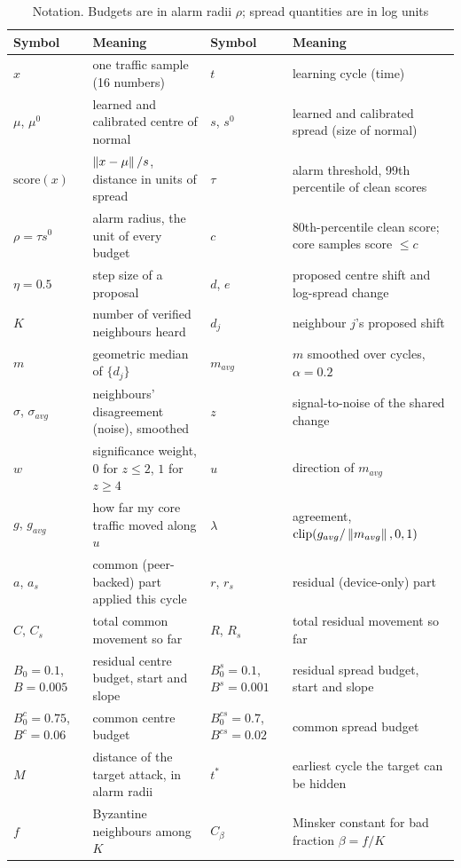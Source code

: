\begin{table}[t]
\caption{Notation. Budgets are in alarm radii $\rho$; spread quantities are in log units}\label{tab:notation}
\centering\footnotesize
\begin{tabular}{@{}ll@{\hspace{1.5em}}ll@{}}
\toprule
Symbol & Meaning & Symbol & Meaning \\
\midrule
$x$ & one traffic sample (16 numbers) & $t$ & learning cycle (time) \\
$\mu$, $\mu^0$ & learned and calibrated centre of normal & $s$, $s^0$ & learned and calibrated spread (size of normal) \\
$\mathrm{score}(x)$ & $\left\lVert x-\mu \right\rVert/s$, distance in units of spread & $\tau$ & alarm threshold, 99th percentile of clean scores \\
$\rho=\tau s^0$ & alarm radius, the unit of every budget & $c$ & 80th-percentile clean score; core samples score $\le c$ \\
$\eta=0.5$ & step size of a proposal & $d$, $e$ & proposed centre shift and log-spread change \\
$K$ & number of verified neighbours heard & $d_j$ & neighbour $j$'s proposed shift \\
$m$ & geometric median of $\{d_j\}$ & $m_{avg}$ & $m$ smoothed over cycles, $\alpha=0.2$ \\
$\sigma$, $\sigma_{avg}$ & neighbours' disagreement (noise), smoothed & $z$ & signal-to-noise of the shared change \\
$w$ & significance weight, $0$ for $z\le2$, $1$ for $z\ge4$ & $u$ & direction of $m_{avg}$ \\
$g$, $g_{avg}$ & how far my core traffic moved along $u$ & $\lambda$ & agreement, $\mathrm{clip}(g_{avg}/\left\lVert m_{avg} \right\rVert,0,1)$ \\
$a$, $a_s$ & common (peer-backed) part applied this cycle & $r$, $r_s$ & residual (device-only) part \\
$C$, $C_s$ & total common movement so far & $R$, $R_s$ & total residual movement so far \\
$B_0=0.1$, $B=0.005$ & residual centre budget, start and slope & $B_0^s=0.1$, $B^s=0.001$ & residual spread budget, start and slope \\
$B_0^c=0.75$, $B^c=0.06$ & common centre budget & $B_0^{cs}=0.7$, $B^{cs}=0.02$ & common spread budget \\
$M$ & distance of the target attack, in alarm radii & $t^\ast$ & earliest cycle the target can be hidden \\
$f$ & Byzantine neighbours among $K$ & $C_\beta$ & Minsker constant for bad fraction $\beta=f/K$ \\
\bottomrule
\end{tabular}
\end{table}
